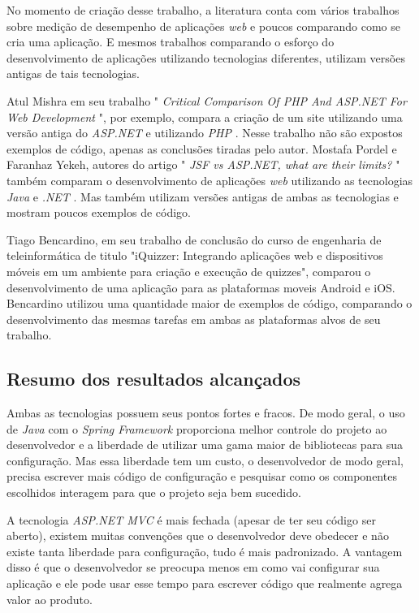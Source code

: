 \documentclass[a4paper,12pt]{article}
\newcommand{\est}[1] {
	\textit{#1}
}
\newcommand{\sigla}[1] {
	\textit{#1}
}
\newcommand{\lang}[1] {
	\textit{#1}
}
\newcommand{\lib}[1] {
	\textit{#1}
}
\begin{document}
No momento de criação desse trabalho, a literatura conta com vários trabalhos sobre medição de desempenho de aplicações \est{web} e poucos comparando como se cria uma aplicação. E mesmos trabalhos comparando o esforço do desenvolvimento de aplicações utilizando tecnologias diferentes, utilizam versões antigas de tais tecnologias. 

Atul Mishra em seu trabalho "\est{Critical Comparison Of PHP And ASP.NET For Web Development}", por exemplo, compara a criação de um site utilizando uma versão antiga do \sigla{ASP.NET} e utilizando \sigla{PHP}. Nesse trabalho não são expostos exemplos de código, apenas as conclusões tiradas pelo autor. Mostafa Pordel e Faranhaz Yekeh, autores do artigo "\est{JSF vs ASP.NET, what are their limits?}" também comparam o desenvolvimento de aplicações \est{web} utilizando as tecnologias \lang{Java} e \lib{.NET}. Mas também utilizam versões antigas de ambas as tecnologias e mostram poucos exemplos de código.

Tiago Bencardino, em seu trabalho de conclusão do curso de engenharia de teleinformática de titulo "iQuizzer: Integrando aplicações web e dispositivos móveis em um ambiente para criação e execução de quizzes", comparou o desenvolvimento de uma aplicação para as plataformas moveis Android e iOS. Bencardino utilizou uma quantidade maior de exemplos de código, comparando o desenvolvimento das mesmas tarefas em ambas as plataformas alvos de seu trabalho.

\subsection{Resumo dos resultados alcançados}

Ambas as tecnologias possuem seus pontos fortes e fracos. De modo geral, o uso de \lang{Java} com o \lib{Spring Framework} proporciona melhor controle do projeto ao desenvolvedor e a liberdade de utilizar uma gama maior de bibliotecas para sua configuração. Mas essa liberdade tem um custo, o desenvolvedor de modo geral, precisa escrever mais código de configuração e pesquisar como os componentes escolhidos interagem para que o projeto seja bem sucedido.

A tecnologia \sigla{ASP.NET MVC} é mais fechada (apesar de ter seu código ser aberto), existem muitas convenções que o desenvolvedor deve obedecer e não existe tanta liberdade para configuração, tudo é mais padronizado. A vantagem disso é que o desenvolvedor se preocupa menos em como vai configurar sua aplicação e ele pode usar esse tempo para escrever código que realmente agrega valor ao produto.
\end{document}
